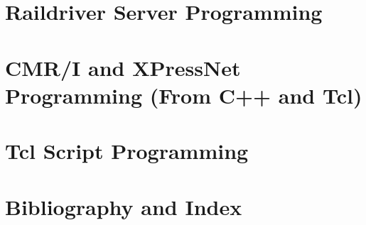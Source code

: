 \documentclass[12pt,notitlepage,twoside]{book}
\begin{document}
\lstset{language=Tcl,basicstyle=\footnotesize,numbers=left,stepnumber=5}%
\newcommand{\MRRSubTitle}{Programming Guides}

\tableofcontents
\lstlistoflistings
\cleardoublepage
%       
\cleardoublepage
{}
%

\part{Raildriver Server Programming}

\part{CMR/I and XPressNet Programming (From C++ and Tcl)}


\part{Tcl Script Programming}











%
\part{Bibliography and Index}
\cleardoublepage
{}


\cleardoublepage
{}
\printindex
\end{document}
